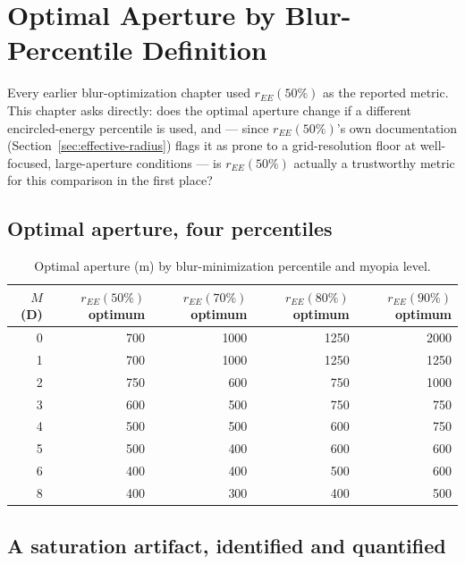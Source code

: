 \chapter{Optimal Aperture by Blur-Percentile Definition}
\label{ch:percentile}

Every earlier blur-optimization chapter used $r_{EE}(50\%)$ as the reported metric.
This chapter asks directly: does the optimal aperture change if a different encircled-energy
percentile is used, and --- since $r_{EE}(50\%)$'s own documentation
(Section~\ref{sec:effective-radius}) flags it as prone to a grid-resolution floor at
well-focused, large-aperture conditions --- is $r_{EE}(50\%)$ actually a trustworthy
metric for this comparison in the first place?

\section{Optimal aperture, four percentiles}

\begin{table}[htbp]
\centering
\begin{tabular}{rrrrr}
\toprule
$M$ (D) & $r_{EE}(50\%)$ optimum & $r_{EE}(70\%)$ optimum & $r_{EE}(80\%)$ optimum & $r_{EE}(90\%)$ optimum \\
\midrule
0 & 700   & 1000  & 1250  & 2000 \\
1 & 700   & 1000  & 1250  & 1250 \\
2 & 750   & 600   & 750   & 1000 \\
3 & 600   & 500   & 750   & 750  \\
4 & 500   & 500   & 600   & 750  \\
5 & 500   & 400   & 600   & 600  \\
6 & 400   & 400   & 500   & 600  \\
8 & 400   & 300   & 400   & 500  \\
\bottomrule
\end{tabular}
\caption{Optimal aperture (\textmu m) by blur-minimization percentile and myopia level.}
\label{tab:percentile-optima}
\end{table}

\section{A saturation artifact, identified and quantified}

